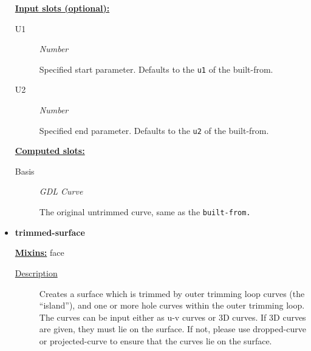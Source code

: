 \documentclass [11pt]{book}
\begin{document}
\begin{itemize}
\begin{description}
\end{description}






\textbf{
\underline{Input slots (optional):}}

\begin{description}

\item [U1]
\emph{Number}

 Specified start parameter. Defaults to the \texttt{u1} of the built-from.




\item [U2]
\emph{Number}

 Specified end parameter. Defaults to the \texttt{u2} of the built-from.




\end{description}






\textbf{
\underline{Computed slots:}}

\begin{description}

\item [Basis]
\emph{GDL Curve}

 The original untrimmed curve, same as the \texttt{built-from.}




\end{description}







\item {}
\label{prim:trimmed-surface}
\textbf{trimmed-surface}


\textbf{
\underline{Mixins:}} face





\begin{description}

\item [
\underline{Description}]


Creates a surface which is trimmed by outer trimming loop curves (the ``island''), and one or more 
hole curves within the outer trimming loop. The curves can be input either as u-v curves or 3D curves.
If 3D curves are given, they must lie on the surface. If not, please use dropped-curve or projected-curve
to ensure that the curves lie on the surface.





\end{description}
\end{itemize}
\end{document}
